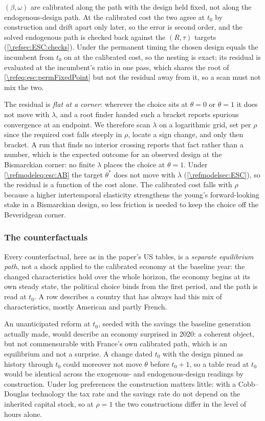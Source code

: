  $\left(\beta,\omega\right)$ are calibrated along the path with the design held fixed, not along the endogenous-design path. At the calibrated cost the two agree at $t_0$ by construction and drift apart only later, so the error is second order, and the solved endogenous path is checked back against the $\left(R,\tau\right)$ targets (\cref{\refsec:ESC:checks}). Under the permanent timing the chosen design equals the incumbent from $t_0$ on at the calibrated cost, so the nesting is exact; its residual is evaluated at the incumbent's ratio in one pass, which shares the root of \eqref{\refeq:esc:permFixedPoint} but not the residual away from it, so a scan must not mix the two.

 The residual is \emph{flat at a corner}: wherever the choice sits at $\theta=0$ or $\theta=1$ it does not move with $\lambda$, and a root finder handed such a bracket reports spurious convergence at an endpoint. We therefore scan $\lambda$ on a logarithmic grid, set per $\rho$ since the required cost falls steeply in $\rho$, locate a sign change, and only then bracket. A run that finds no interior crossing reports that fact rather than a number, which is the expected outcome for an observed design at the Bismarckian corner: no finite $\lambda$ places the choice at $\theta=1$. Under \eqref{\refmodeleq:esc:AB} the target $\theta^{\ast}$ does not move with $\lambda$ (\cref{\refmodelsec:ESC}), so the residual is a function of the cost alone. The calibrated cost falls with $\rho$ because a higher intertemporal elasticity strengthens the young's forward-looking stake in a Bismarckian design, so less friction is needed to keep the choice off the Beveridgean corner.


\subsubsection{The counterfactuals}\label{\refsec:ESC:counterfactuals}
Every counterfactual, here as in the paper's US tables, is a \emph{separate equilibrium path}, not a shock applied to the calibrated economy at the baseline year: the changed characteristics hold over the whole horizon, the economy begins at its own steady state, the political choice binds from the first period, and the path is read at $t_0$. A row describes a country that has always had this mix of characteristics, mostly American and partly French.

An unanticipated reform at $t_0$, seeded with the savings the baseline generation actually made, would describe an economy surprised in 2020: a coherent object, but not commensurable with France's own calibrated path, which is an equilibrium and not a surprise. A change dated $t_0$ with the design pinned as history through $t_0$ could moreover not move $\theta$ before $t_0+1$, so a table read at $t_0$ would be identical across the exogenous- and endogenous-design readings by construction. Under log preferences the construction matters little: with a Cobb--Douglas technology the tax rate and the savings rate do not depend on the inherited capital stock, so at $\rho=1$ the two constructions differ in the level of hours alone.

